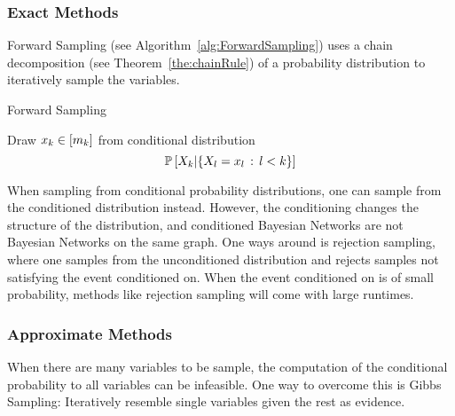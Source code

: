 \subsubsection{Exact Methods}

Forward Sampling (see Algorithm~\ref{alg:ForwardSampling}) uses a chain decomposition (see Theorem~\ref{the:chainRule}) of a probability distribution to iteratively sample the variables.

\begin{algorithm}[hbt!]
\caption{Forward Sampling}\label{alg:ForwardSampling}
\begin{algorithmic}
\For{$\atomenumeratorin$}
	\State Draw $x_{k}\in[m_{k}]$ from conditional distribution 
		\[ \mathbb{P}\left[X_{k}|\{X_{l} = x_{l} \, : \, l < k \}\right] \]
\EndFor
\end{algorithmic}
\end{algorithm}





When sampling from conditional probability distributions, one can sample from the conditioned distribution instead.
However, the conditioning changes the structure of the distribution, and conditioned Bayesian Networks are not Bayesian Networks on the same graph.
One ways around is rejection sampling, where one samples from the unconditioned distribution and rejects samples not satisfying the event conditioned on.
When the event conditioned on is of small probability, methods like rejection sampling will come with large runtimes.

\subsubsection{Approximate Methods}

When there are many variables to be sample, the computation of the conditional probability to all variables can be infeasible.
One way to overcome this is Gibbs Sampling: Iteratively resemble single variables given the rest as evidence.


